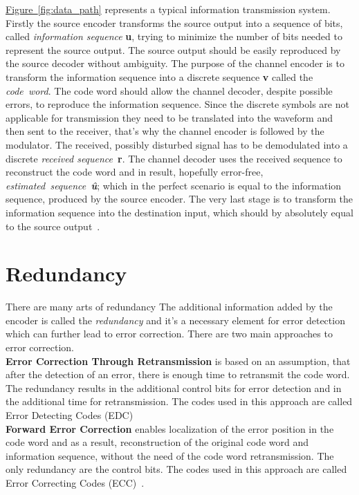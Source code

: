 \documentclass[]{myclass}
\begin{document}
\noindent\hyperref[fig:data_path]{Figure~\ref*{fig:data_path}} represents a typical information transmission system. Firstly the source encoder transforms the source output into a sequence of bits, called \textit{information sequence} \textbf{u}, trying to minimize the number of bits needed to represent the source output. The source output should be easily reproduced by the source decoder without ambiguity. The purpose of the channel encoder is to transform the information sequence into a discrete sequence \textbf{v} called the \textit{code~word}. The code word should allow the channel decoder, despite possible errors, to reproduce the information sequence. Since the discrete symbols are not applicable for transmission they need to be translated into the waveform and then sent to the receiver, that's why the channel encoder is followed by the modulator. The received, possibly disturbed signal has to be demodulated into a discrete \textit{received sequence}~\textbf{r}. The channel decoder uses the received sequence to reconstruct the code word and in result, hopefully error-free, \textit{estimated~sequence~\textbf{\^{u}}}; which in the perfect scenario is equal to the information sequence, produced by the source encoder. The very last stage is to transform the information sequence into the destination input, which should by absolutely equal to the source output~\cite{book:LinCostello}.\\

\section{Redundancy} \label{sec:red}
There are many arts of redundancy 
The additional information added by the encoder is called the \textit{redundancy} and it's a necessary element for error detection which can further lead to error correction. There are two main approaches to error correction.\\[\baselineskip]
\textbf{Error Correction Through Retransmission} is based on an assumption, that after the detection of an error, there is enough time to retransmit the code word. The redundancy results in the additional control bits for error detection and in the additional time for retransmission. The codes used in this approach are called Error Detecting Codes (EDC)\\[\baselineskip]
\textbf{Forward Error Correction} enables localization of the error position in the code word and as a result, reconstruction of the original code word and information sequence, without the need of the code word retransmission. The only redundancy are the control bits. The codes used in this approach are called Error Correcting Codes (ECC)~\cite{book:SchonfeldKlimant}.\\
\end{document}
